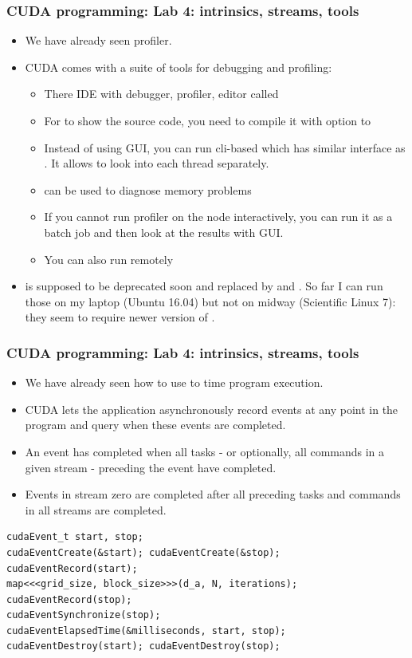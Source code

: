 \begin{frame}[fragile]
  \frametitle{CUDA programming: Lab 4: intrinsics, streams, tools}
\begin{itemize}
\item We have already seen  profiler.
\item CUDA comes with a suite of tools for debugging and profiling:
  \begin{itemize}
  \item There IDE with debugger, profiler, editor called 
  \item For  to show the source code, you need to compile it with  option to 
  \item Instead of using  GUI, you can run cli-based  which has similar interface as . It allows to look into each thread separately.
  \item {} can be used to diagnose memory problems
  \item If you cannot run profiler on the node interactively, you can run it as a batch job and then look at the results with GUI.
  \item You can also run  remotely
  \end{itemize}
\item {} is supposed to be deprecated soon and replaced by  and . So far I can run those on my laptop (Ubuntu 16.04) but not on midway (Scientific Linux 7): they seem to require newer version of .
\end{itemize}
\end{frame}


\begin{frame}[fragile]
  \frametitle{CUDA programming: Lab 4: intrinsics, streams, tools}
\begin{itemize}
\item We have already seen how to use  to time program execution.
\item CUDA lets the application asynchronously record events at
  any point in the program and query when these events are completed. 
\item An event has completed when all tasks - or optionally, all commands in a given stream - preceding the
  event have completed. 
\item Events in stream zero are completed after all preceding tasks and
  commands in all streams are completed.
\end{itemize}
{\small
{\color{mycolorcode}
\begin{verbatim}
cudaEvent_t start, stop;
cudaEventCreate(&start); cudaEventCreate(&stop);
cudaEventRecord(start);
map<<<grid_size, block_size>>>(d_a, N, iterations);
cudaEventRecord(stop); 
cudaEventSynchronize(stop);
cudaEventElapsedTime(&milliseconds, start, stop);
cudaEventDestroy(start); cudaEventDestroy(stop);
\end{verbatim}
}
}
\end{frame}
